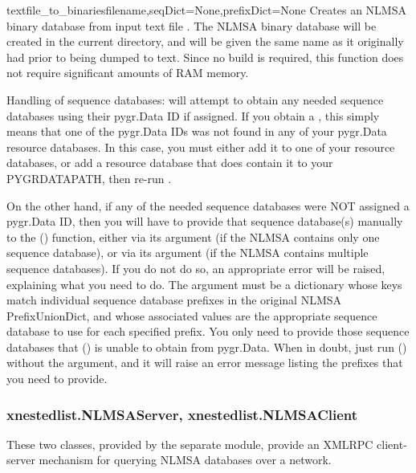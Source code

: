 \documentclass{howto}
\begin{document}
\begin{funcdesc}{textfile_to_binaries}{filename,seqDict=None,prefixDict=None}
  Creates an NLMSA binary database from input text file .
  The NLMSA binary database will be created in the current directory,
  and will be given the same name as it originally had prior to being dumped to text.
  Since no build is required, this function does not require significant amounts
  of RAM memory.

  Handling of sequence databases:  will attempt to 
  obtain any needed sequence databases using their pygr.Data ID if assigned.
  If you obtain a , this simply means that one
  of the pygr.Data IDs was not found in any of your pygr.Data resource
  databases.  In this case, you must either add it to one of your resource
  databases, or add a resource database that does contain it to your PYGRDATAPATH,
  then re-run .

  On the other hand, if any of the needed sequence databases were NOT assigned
  a pygr.Data ID, then you will have to provide that sequence database(s)
  manually to the () function, either via
  its  argument (if the NLMSA contains only one sequence database),
  or via its  argument (if the NLMSA contains multiple sequence
  databases).  If you do not
  do so, an appropriate error will be raised, explaining what you need to do.
  The  argument must be a dictionary whose keys match 
  individual sequence database prefixes in the original NLMSA PrefixUnionDict,
  and whose associated values are the appropriate sequence database to use
  for each specified prefix.  You only need to provide those sequence databases
  that () is unable to obtain from pygr.Data.
  When in doubt, just run () without the 
  argument, and it will raise an error message listing the prefixes that you
  need to provide.
\end{funcdesc}



\subsubsection{xnestedlist.NLMSAServer, xnestedlist.NLMSAClient}
These two classes, provided by the separate  module,
provide an XMLRPC client-server mechanism for querying NLMSA databases
over a network.  
\end{document}
